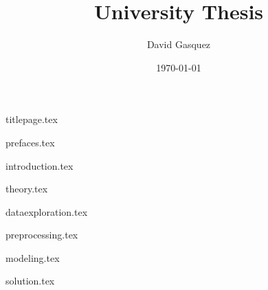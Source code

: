\documentclass[
    a4paper,
    12pt
]{report}
\title{University Thesis}
\author{David Gasquez}
\date{\today}
\begin{document}
{titlepage.tex}

{prefaces.tex}

{introduction.tex}

{theory.tex}

{dataexploration.tex}

{preprocessing.tex}

{modeling.tex}

{solution.tex}

\printbibliography
\end{document}
